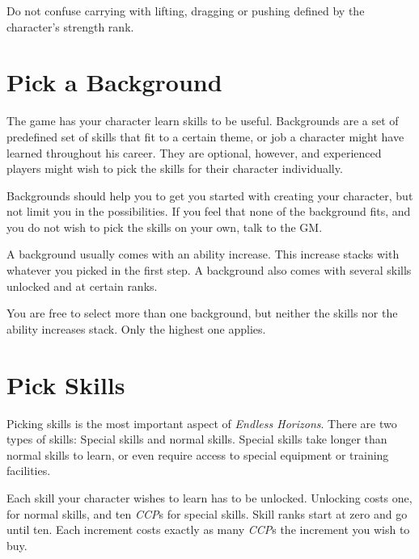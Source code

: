 Do not confuse carrying with lifting, dragging or pushing defined by
the character's strength rank.

\section{Pick a Background}
\label{sec:2-Pick a Background}

The game has your character learn skills to be useful. Backgrounds are a set of
predefined set of skills that fit to a certain theme, or job a character might
have learned throughout his career. They are optional, however, and experienced
players might wish to pick the skills for their character individually.

Backgrounds should help you to get you started with creating your character, but
not limit you in the possibilities. If you feel that none of the background fits,
and you do not wish to pick the skills on your own, talk to the GM.

A background usually comes with an ability increase. This increase stacks with
whatever you picked in the first step. A background also comes with several
skills unlocked and at certain ranks.

You are free to select more than one background, but neither the skills nor the
ability increases stack. Only the highest one applies.

\section{Pick Skills}
\label{sec:2-Pick Skills}

Picking skills is the most important aspect of \emph{Endless Horizons}. There
are two types of skills: Special skills and normal skills. Special skills take
longer than normal skills to learn, or even require access to special equipment
or training facilities.

Each skill your character wishes to learn has to be unlocked. Unlocking costs
one, for normal skills, and ten \emph{CCP}s for special skills. Skill ranks
start at zero and go until ten. Each increment costs exactly as many
\emph{CCP}s the increment you wish to buy.

